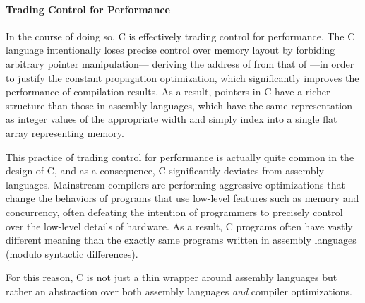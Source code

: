 

\paragraph{Trading Control for Performance}

In the course of doing so, C is effectively trading control for performance.  The C language
intentionally loses precise control over memory layout by forbiding arbitrary pointer
manipulation---\eg{} deriving the address of  from that of ---in order to
justify the constant propagation optimization, which significantly improves the performance of
compilation results.  As a result, pointers in C have a richer structure than those in assembly
languages, which have the same representation as integer values of the appropriate width and simply
index into a single flat array representing memory.

This practice of trading control for performance is actually quite common in the design of C, and as
a consequence, C significantly deviates from assembly languages.  Mainstream compilers are
performing aggressive optimizations that change the behaviors of programs that use low-level
features such as memory and concurrency, often defeating the intention of programmers to precisely
control over the low-level details of hardware.  As a result, C programs often have vastly different
meaning than the exactly same programs written in assembly languages (modulo syntactic differences).

For this reason, C is not just a thin wrapper around assembly languages but rather an abstraction
over both assembly languages \emph{and} compiler optimizations.








